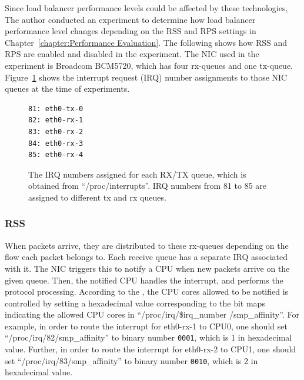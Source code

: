 Since load balancer performance levels could be affected by these technologies,
The author conducted an experiment to determine how load balancer performance level changes depending on the RSS and RPS settings in Chapter~\ref{chapter:Performance Evaluation}.
The following shows how RSS and RPS are enabled and disabled in the experiment. 
The NIC used in the experiment is Broadcom BCM5720, which has four rx-queues and one tx-queue.
Figure~\ref{fig:rx-queue} shows the interrupt request (IRQ) number assignments to those NIC queues at the time of experiments.

\begin{figure}[h]
\centering
\begin{minipage}{0.3\columnwidth}
\begin{verbatim}
81: eth0-tx-0
82: eth0-rx-1
83: eth0-rx-2
84: eth0-rx-3
85: eth0-rx-4
\end{verbatim}
\end{minipage}

\par\bigskip
\centering
\begin{minipage}{0.9\columnwidth}
  \caption[The IRQ numbers assigned for each RX/TX queue]{
    The IRQ numbers assigned for each RX/TX queue, which is obtained from \enquote{/proc/interrupts}.
    IRQ numbers from 81 to 85 are assigned to different tx and rx queues.
  }
  \label{fig:rx-queue}
\end{minipage}

\end{figure}

\subsubsection{RSS}

When packets arrive, they are distributed to these rx-queues depending on the flow each packet belongs to.
Each receive queue has a separate IRQ associated with it. The NIC triggers
this to notify a CPU when new packets arrive on the given queue.
Then, the notified CPU handles the interrupt, and performs the protocol processing. 
According to the \cite{TomHerbert}, the CPU cores allowed to be notified is controlled by setting 
a hexadecimal value corresponding to the bit maps indicating the allowed CPU cores in \enquote{/proc/irq/\$irq\_number /smp\_affinity}.
%
For example, in order to route the interrupt for eth0-rx-1 to CPU0, 
one should set \enquote{/proc/irq/82/smp\_affinity} 
to binary number {\tt 0001}, which is 1 in hexadecimal value.
Further, in order to route the interrupt for eth0-rx-2 to CPU1, one 
should set \enquote{/proc/irq/83/smp\_affinity} 
to binary number {\tt 0010}, which is 2 in hexadecimal value.

